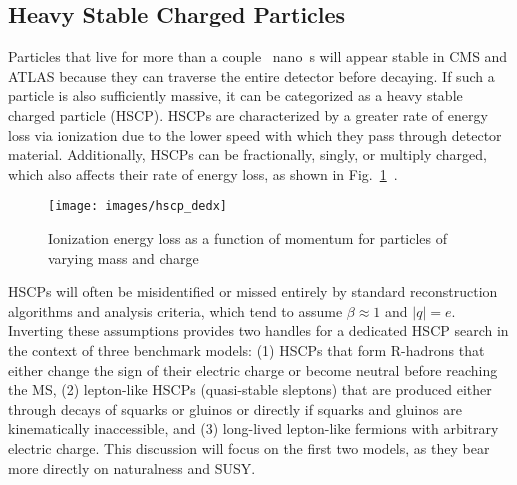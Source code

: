 \documentclass[12pt]{article}
\begin{document}
    \subsection{Heavy Stable Charged Particles}
        Particles that live for more than a couple \SI{}{nano\s} will appear stable in CMS and ATLAS because they can traverse the entire detector before decaying. If such a particle is also sufficiently massive, it can be categorized as a heavy stable charged particle (HSCP). HSCPs are characterized by a greater rate of energy loss via ionization due to the lower speed with which they pass through detector material. Additionally, HSCPs can be fractionally, singly, or multiply charged, which also affects their rate of energy loss, as shown in Fig.~\ref{hscp_dedx}~\cite{cms_hscp}.

        \noindent \begin{figure}[htbp] \begin{center}
        \texttt{[image: images/hscp\_dedx]}
            \caption{Ionization energy loss as a function of momentum for particles of varying mass and charge~\cite{cms_hscp}}
        \label{hscp_dedx}
        \end{center} \end{figure}

        HSCPs will often be misidentified or missed entirely by standard reconstruction algorithms and analysis criteria, which tend to assume $\beta \approx \num{1}$ and $\lvert q \rvert = e$. Inverting these assumptions provides two handles for a dedicated HSCP search in the context of three benchmark models: (1) HSCPs that form R-hadrons that either change the sign of their electric charge or become neutral before reaching the MS, (2) lepton-like HSCPs (quasi-stable sleptons) that are produced either through decays of squarks or gluinos or directly if squarks and gluinos are kinematically inaccessible, and (3) long-lived lepton-like fermions with arbitrary electric charge. This discussion will focus on the first two models, as they bear more directly on naturalness and SUSY.

         
\end{document}
